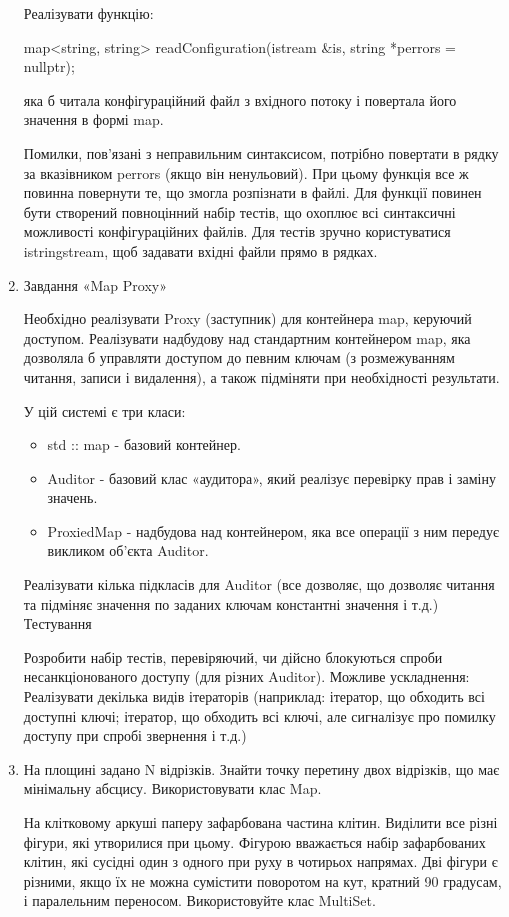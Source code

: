 \documentclass[]{article}
\begin{document}
\begin{enumerate}
  Реалізувати функцію:

  map\textless{}string, string\textgreater{} readConfiguration(istream
  \&is, string *perrors = nullptr);

  яка б читала конфігураційний файл з вхідного потоку і повертала його
  значення в формі map.

  Помилки, пов'язані з неправильним синтаксисом, потрібно повертати в
  рядку за вказівником perrors (якщо він ненульовий). При цьому функція
  все ж повинна повернути те, що змогла розпізнати в файлі. Для функції
  повинен бути створений повноцінний набір тестів, що охоплює всі
  синтаксичні можливості конфігураційних файлів. Для тестів зручно
  користуватися istringstream, щоб задавати вхідні файли прямо в рядках.

\item
  Завдання «Map Proxy»

  Необхідно реалізувати Proxy (заступник) для контейнера map, керуючий
  доступом. Реалізувати надбудову над стандартним контейнером map, яка
  дозволяла б управляти доступом до певним ключам (з розмежуванням
  читання, записи і видалення), а також підміняти при необхідності
  результати.

  У цій системі є три класи:

  \begin{itemize}
  \item
    std :: map - базовий контейнер.
  \item
    Auditor - базовий клас «аудитора», який реалізує перевірку прав і
    заміну значень.
  \item
    ProxiedMap - надбудова над контейнером, яка все операції з ним
    передує викликом об'єкта Auditor.
  \end{itemize}

  Реалізувати кілька підкласів для Auditor (все дозволяє, що дозволяє
  читання та підміняє значення по заданих ключам константні значення і
  т.д.) Тестування

  Розробити набір тестів, перевіряючий, чи дійсно блокуються спроби
  несанкціонованого доступу (для різних Auditor). Можливе ускладнення:
  Реалізувати декілька видів ітераторів (наприклад: ітератор, що
  обходить всі доступні ключі; ітератор, що обходить всі ключі, але
  сигналізує про помилку доступу при спробі звернення і т.д.)

\item
На площині задано N відрізків. Знайти точку перетину двох відрізків, що
має мінімальну абсцису. Використовувати клас Map.

На клітковому аркуші паперу зафарбована частина клітин. Виділити все
різні фігури, які утворилися при цьому. Фігурою вважається набір
зафарбованих клітин, які сусідні один з одного при руху в чотирьох
напрямах. Дві фігури є різними, якщо їх не можна сумістити поворотом на
кут, кратний 90 градусам, і паралельним переносом. Використовуйте клас
MultiSet.

\end{enumerate}
\end{document}
